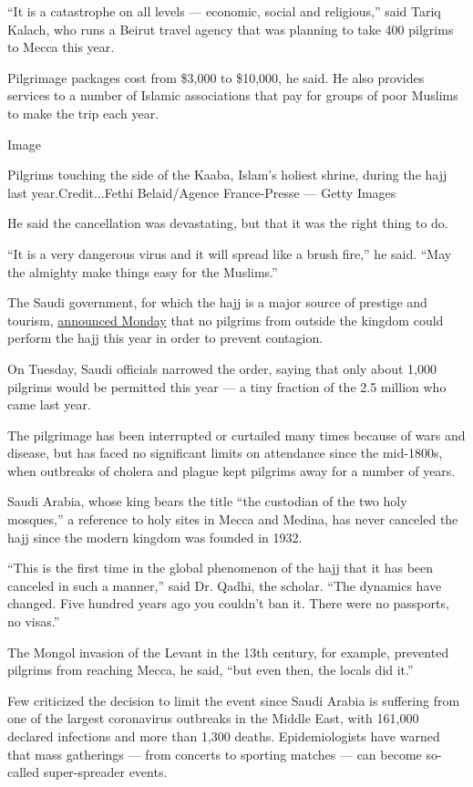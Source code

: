 ``It is a catastrophe on all levels --- economic, social and
religious,'' said Tariq Kalach, who runs a Beirut travel agency that was
planning to take 400 pilgrims to Mecca this year.

Pilgrimage packages cost from \$3,000 to \$10,000, he said. He also
provides services to a number of Islamic associations that pay for
groups of poor Muslims to make the trip each year.

Image

Pilgrims touching the side of the Kaaba, Islam's holiest shrine, during
the hajj last year.Credit...Fethi Belaid/Agence France-Presse --- Getty
Images

He said the cancellation was devastating, but that it was the right
thing to do.

``It is a very dangerous virus and it will spread like a brush fire,''
he said. ``May the almighty make things easy for the Muslims.''

The Saudi government, for which the hajj is a major source of prestige
and tourism,
\href{https://www.nytimes3xbfgragh.onion/2020/06/22/world/middleeast/saudi-arabia-hajj-mecca-pilgrims.html}{announced
Monday} that no pilgrims from outside the kingdom could perform the hajj
this year in order to prevent contagion.

On Tuesday, Saudi officials narrowed the order, saying that only about
1,000 pilgrims would be permitted this year --- a tiny fraction of the
2.5 million who came last year.

The pilgrimage has been interrupted or curtailed many times because of
wars and disease, but has faced no significant limits on attendance
since the mid-1800s, when outbreaks of cholera and plague kept pilgrims
away for a number of years.

Saudi Arabia, whose king bears the title ``the custodian of the two holy
mosques,'' a reference to holy sites in Mecca and Medina, has never
canceled the hajj since the modern kingdom was founded in 1932.

``This is the first time in the global phenomenon of the hajj that it
has been canceled in such a manner,'' said Dr. Qadhi, the scholar. ``The
dynamics have changed. Five hundred years ago you couldn't ban it. There
were no passports, no visas.''

The Mongol invasion of the Levant in the 13th century, for example,
prevented pilgrims from reaching Mecca, he said, ``but even then, the
locals did it.''

Few criticized the decision to limit the event since Saudi Arabia is
suffering from one of the largest coronavirus outbreaks in the Middle
East, with 161,000 declared infections and more than 1,300 deaths.
Epidemiologists have warned that mass gatherings --- from concerts to
sporting matches --- can become so-called super-spreader events.

